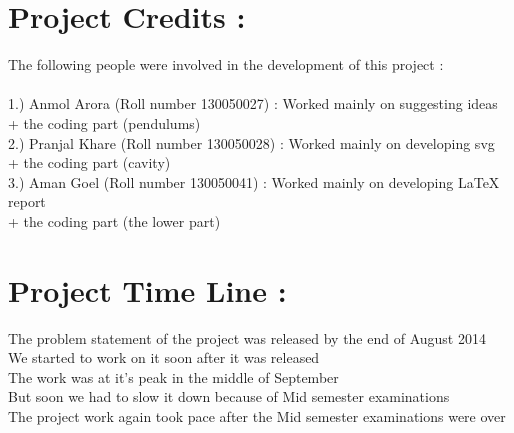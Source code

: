 \documentclass{article}
\begin{document}
\section{Project Credits : }
\hspace*{5 mm}The following people were involved in the development of this project : \\
\\
\hspace*{10 mm}1.) Anmol Arora (Roll number 130050027) : Worked mainly on suggesting ideas \\
\hspace*{10mm} + the coding part (pendulums) \\
\hspace*{10 mm}2.) Pranjal Khare (Roll number 130050028) : Worked mainly on developing svg \\
\hspace*{10mm} + the coding part (cavity) \\
\hspace*{10 mm}3.) Aman Goel (Roll number 130050041) : Worked mainly on developing LaTeX report \\
\hspace*{10mm} + the coding part (the lower part) \\
\section{Project Time Line : }
\hspace*{5 mm}The problem statement of the project was released by the end of August 2014 \\
\hspace*{5 mm}We started to work on it soon after it was released \\
\hspace*{5 mm}The work was at it's peak in the middle of September \\
\hspace*{5 mm}But soon we had to slow it down because of Mid semester examinations \\
\hspace*{5 mm}The project work again took pace after the Mid semester examinations were over \\
\end{document}
